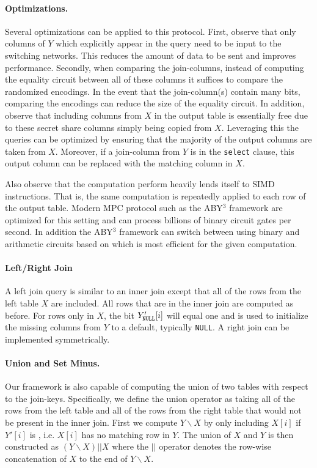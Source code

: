 \iffullversion
\paragraph{Optimizations.}
Several optimizations can be applied to this protocol. First, observe that only columns of $Y$ which explicitly appear in the query need to be input to the switching networks. This reduces the amount of data to be sent and improves performance. Secondly, when comparing the join-columns, instead of computing the equality circuit between all of these columns it suffices to compare the randomized encodings. In the event that the join-column(s) contain many bits, comparing the encodings can reduce the size of the equality circuit. In addition, observe that including columns from $X$ in the output table is essentially free due to these secret share columns simply being copied from $X$. Leveraging this the queries can be optimized by ensuring that the majority of the output columns are taken from $X$. Moreover, if a join-column from $Y$ is in the \texttt{select} clause, this output column can be replaced with the matching column in $X$.

Also observe that the computation perform heavily lends itself to SIMD instructions. That is, the same computation is repeatedly applied to each row of the output table. Modern MPC protocol such as the ABY$^3$ framework \cite{aby3,highthroughput} are optimized for this setting and can process billions of binary circuit gates per second\cite{highthroughput}. In addition the ABY$^3$ framework can switch between using binary and arithmetic circuits based on which is most efficient for the given computation. 
\fi

\paragraph{Left/Right Join}
A left join query is similar to an inner join except that all of the rows from the left table $X$ are included. All rows that are in the inner join are computed as before. For rows only in $X$, the bit $Y_\texttt{NULL}'[i]$ will equal one and is used to initialize the missing columns from $Y$ to a default, typically \texttt{NULL}. A right join can be implemented symmetrically.

\paragraph{Union and Set Minus.}
Our framework is also capable of computing the union of two tables with respect to the join-keys. Specifically, we define the union operator as taking all of the rows from the left table and all of the rows from the right table that would not be present in the inner join. First we compute $Y\backslash X$ by only including $X[i]$ if $Y'[i]$ is \Null, i.e. $X[i]$ has no matching row in $Y$. The union of $X$ and $Y$ is then constructed as $(Y\backslash X) || X$ where the $||$ operator denotes the row-wise concatenation of $X$ to the end of $Y\backslash X$.


